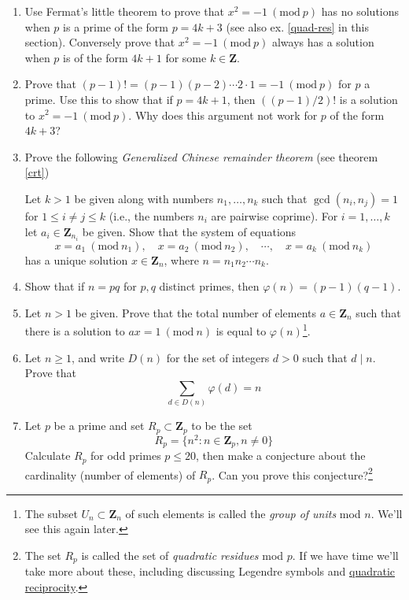 \documentclass[12pt]{article}
\numberwithin{equation}{subsection}
\theoremstyle{note}
\newcommand{\Mod}[1]{\ (\mathrm{mod}\ #1)}
\begin{document}
\begin{enumerate}[label=\arabic*.]
	\item Use Fermat's little theorem  to prove that $x^2=-1\Mod{p}$ has no solutions when $p$ is a prime of the form $p=4k+3$ (see also ex. \ref{quad-res} in this section). Conversely prove that $x^2=-1\Mod{p}$ always has a solution when $p$ is of the form $4k+1$ for some $k\in\mathbf{Z}$.
	
	\item Prove that $(p-1)!=(p-1)(p-2)\cdots2\cdot 1 =-1 \Mod{p}$ for $p$ a prime. Use this to show that if $p=4k+1$, then $((p-1)/2)!$ is a solution to $x^2=-1\Mod{p}$. Why does this argument not work for $p$ of the form $4k+3$?
	
	
	
	\item \label{gcrt} Prove the following \textit{Generalized Chinese remainder theorem} (see theorem \ref{crt}) 
	
	Let $k>1$ be given along with numbers $n_1,\dots,n_k$ such that $\gcd(n_i,n_j)=1$ for $1\leq i\neq j\leq k$ (i.e., the numbers $n_i$ are pairwise coprime). For $i=1,\dots,k$ let $a_i\in\mathbf{Z}_{n_i}$ be given. Show that the system of equations \[ x=a_1\Mod{n_1}, \quad x=a_2\Mod{n_2} ,\quad \cdots, \quad  x=a_k\Mod{n_k}\] has a unique solution $x\in\mathbf{Z}_{n}$, where $n=n_1n_2\cdots n_k$.  
	
	\item Show that if $n=pq$ for $p,q$ distinct primes, then $\varphi(n)=(p-1)(q-1)$. 
	
	\item Let $n>1$ be given. Prove that the total number of elements $a\in \mathbf{Z}_n$ such that there is a solution to $ax=1\Mod{n}$ is equal to $\varphi(n)$\footnote{The subset $U_n\subset \mathbf{Z}_n$ of such elements is called the \textit{group of units} mod $n$. We'll see this again later.}.
	\item Let $n\geq 1$, and write $D(n)$ for the set of integers $d>0$ such that $d\mid n$. Prove that \[ \sum_{d\in D(n)} \varphi(d)=n\]
	\item \label{quad-res} Let $p$ be a prime and set $R_p\subset\mathbf{Z}_p$ to be the set \[R_p=\{n^2 : n\in\mathbf{Z}_p, n\neq 0\}\] Calculate $R_p$ for odd primes $p\leq 20$, then make a conjecture about the cardinality (number of elements) of $R_p$. Can you prove this conjecture?\footnote{The set $R_p$ is called the set of \textit{quadratic residues} mod $p$. If we have time we'll take more about these, including discussing Legendre symbols and \href{https://en.wikipedia.org/wiki/Quadratic_reciprocity}{quadratic reciprocity}.}
	

\end{enumerate}
\end{document}
